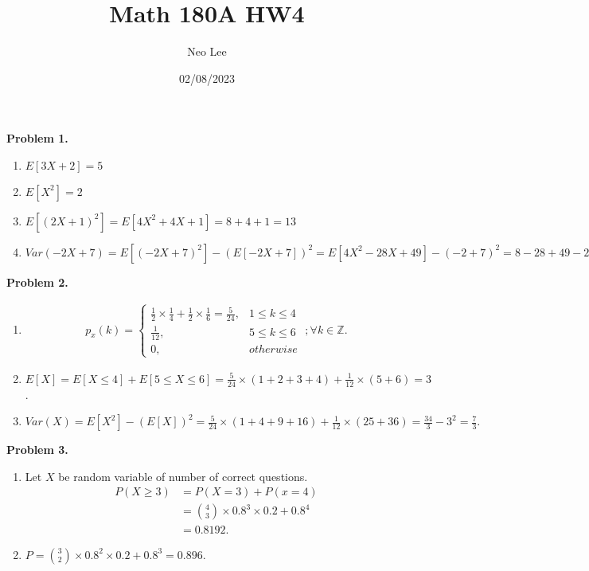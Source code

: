\documentclass{article}
\title{Math 180A HW4}
\author{Neo Lee}
\date{02/08/2023}
\begin{document}
 

\maketitle 

\textbf{Problem 1.}
\begin{enumerate}[label={(\alph*)}]
    \item $E[3X + 2] = 5$
    \item $E[X^2] = 2$ 
    \item $E[(2X+1)^2] = E[4X^2 + 4X + 1] = 8 + 4 + 1  = 13$
    \item $Var(-2X+7)=E[(-2X+7)^2]-(E[-2X+7])^2=E[4X^2-28X+49]-(-2+7)^2=8-28+49-25=4$
\end{enumerate}
\bigbreak

\textbf{Problem 2.}
\begin{enumerate}[label={(\alph*)}]
    \item 
    \begin{align}
        p_x(k) = \begin{cases}
            \frac{1}{2} \times \frac{1}{4} + \frac{1}{2} \times \frac{1}{6} = \frac{5}{24}, & 1 \le k \le 4 \\
            \frac{1}{12}, & 5 \le k \le 6 \\
            0, & otherwise
        \end{cases}
        \; ; \forall k \in \mathbb{Z}.
    \end{align}

    \item 
    $E[X]=E[X \le 4]+E[5 \le X \le 6]=\frac{5}{24} \times (1+2+3+4) + \frac{1}{12} \times (5+6)=3$.

    \item 
    $Var(X)=E[X^2]-(E[X])^2=\frac{5}{24} \times (1+4+9+16) + \frac{1}{12} \times (25+36)=\frac{34}{3}-3^2=\frac{7}{3}.$
\end{enumerate}
\bigbreak

\textbf{Problem 3.}
\begin{enumerate}[label={(\alph*)}]
    \item 
    Let $X$ be random variable of number of correct questions. 
    \begin{align}
        P(X \ge 3) & = P(X=3)+P(x=4) \\
        & = {4 \choose 3} \times 0.8^3 \times 0.2 + 0.8^4 \\
        & = 0.8192.
    \end{align}

    \item 
    $P = {3 \choose 2}\times 0.8^2 \times 0.2 + 0.8^3 = 0.896.$
\end{enumerate}
\bigbreak
\end{document}
